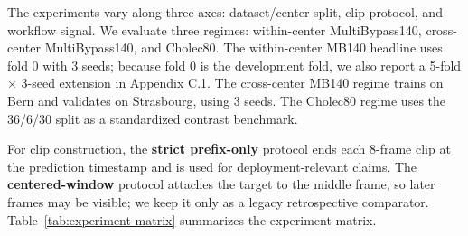 The experiments vary along three axes: dataset/center split, clip
protocol, and workflow signal. We evaluate three regimes: within-center
MultiBypass140, cross-center MultiBypass140, and Cholec80. The
within-center MB140 headline uses fold 0 with 3 seeds; because fold 0 is
the development fold, we also report a 5-fold \(\times\) 3-seed
extension in Appendix C.1. The cross-center MB140 regime trains on Bern
and validates on Strasbourg, using 3 seeds. The Cholec80 regime uses the
36/6/30 split as a standardized contrast benchmark.

For clip construction, the \textbf{strict prefix-only} protocol ends each
8-frame clip at the prediction timestamp and is used for
deployment-relevant claims. The \textbf{centered-window} protocol
attaches the target to the middle frame, so later frames may be visible;
we keep it only as a legacy retrospective comparator. Table~\ref{tab:experiment-matrix} summarizes the experiment matrix.

